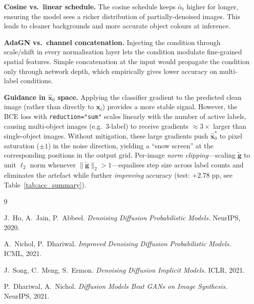 \documentclass[12pt, a4paper]{report}
\begin{document}
\textbf{Cosine vs.\ linear schedule.}
The cosine schedule keeps $\bar\alpha_t$ higher for longer, ensuring the model
sees a richer distribution of partially-denoised images.
This leads to cleaner backgrounds and more accurate object colours at inference.

\textbf{AdaGN vs.\ channel concatenation.}
Injecting the condition through scale/shift in every normalisation layer lets the
condition modulate fine-grained spatial features.
Simple concatenation at the input would propagate the condition only through
network depth, which empirically gives lower accuracy on multi-label conditions.

\textbf{Guidance in $\hat{\mathbf{x}}_0$ space.}
Applying the classifier gradient to the predicted clean image (rather than directly
to $\mathbf{x}_t$) provides a more stable signal.
However, the BCE loss with \texttt{reduction="sum"} scales linearly with the
number of active labels, causing multi-object images (e.g.\ 3-label) to receive
gradients $\approx 3\times$ larger than single-object images.
Without mitigation, these large gradients push $\hat{\mathbf{x}}_0^*$ to pixel
saturation ($\pm 1$) in the noise direction, yielding a ``snow screen'' at the
corresponding positions in the output grid.
Per-image \emph{norm clipping}---scaling $\tilde{\mathbf{g}}$ to unit $\ell_2$
norm whenever $\|\tilde{\mathbf{g}}\|_2 > 1$---equalises step size across label
counts and eliminates the artefact while further \emph{improving} accuracy
(test: $+2.78$ pp, see Table~\ref{tab:acc_summary}).

\begin{thebibliography}{9}

J.~Ho, A.~Jain, P.~Abbeel.
\textit{Denoising Diffusion Probabilistic Models.}
NeurIPS, 2020.

A.~Nichol, P.~Dhariwal.
\textit{Improved Denoising Diffusion Probabilistic Models.}
ICML, 2021.

J.~Song, C.~Meng, S.~Ermon.
\textit{Denoising Diffusion Implicit Models.}
ICLR, 2021.

P.~Dhariwal, A.~Nichol.
\textit{Diffusion Models Beat GANs on Image Synthesis.}
NeurIPS, 2021.

\end{thebibliography}
\end{document}
